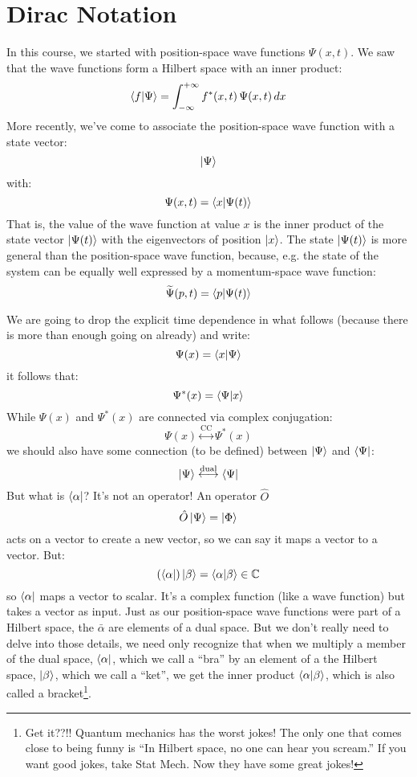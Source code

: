 \documentclass[12pt]{book}
\begin{document}
\section{Dirac Notation}

In this course, we started with position-space wave functions $\Psi(x,t)$.  We saw that the wave functions form a Hilbert space with an inner product:
$$\braket{f|\Psi} = \int_{-\infty}^{+\infty} f^*(x,t) \, \Psi(x,t) \, dx$$
More recently, we've come to associate the position-space wave function with a state vector:
$$\ket{\Psi}$$
with:
$$\Psi(x,t) = \braket{x|\Psi(t)}$$
That is, the value of the wave function at value $x$ is the inner product of the state vector 
$\ket{\Psi(t)}$ with the eigenvectors of position $\ket{x}$.  The state $\ket{\Psi(t)}$ is more general than the position-space wave function, because, e.g. the state of the system can be equally well expressed by a momentum-space wave function:
$$\widetilde{\Psi}(p,t) = \braket{p|\Psi(t)}$$

We are going to drop the explicit time dependence in what follows (because there is more than enough going on already) and write:
$$\Psi(x) = \braket{x|\Psi}$$
it follows that:
$$\Psi^*(x) = \braket{\Psi|x}$$
While $\Psi(x)$ and $\Psi^*(x)$ are connected via complex conjugation:
$$\Psi(x) \overset{\text{CC}}{\longleftrightarrow} \Psi^*(x)$$
we should also have some connection (to be defined) between $\ket{\Psi}$ and $\bra{\Psi}$:
$$\ket{\Psi} \overset{\text{dual}}{\longleftrightarrow} \bra{\Psi}$$
But what is $\bra{\alpha}$?  It's not an operator!  An operator $\hat{O}$
$$\hat{O} \ket{\Psi} = \ket{\Phi}$$
acts on a vector to create a new vector, so we can say it maps a vector to a vector.  But:
$$(\bra{\alpha}) \ket{\beta} = \braket{\alpha|\beta} \in \mathbb{C}$$
so $\bra{\alpha}$ maps a vector to scalar.  It's a complex function (like a wave function) but takes a vector as input.  Just as our position-space wave functions were part of a Hilbert space, the $\bar{\alpha}$ are elements of a dual space.  But we don't really need to delve into those details, we need only recognize that when we multiply a member of the dual space, $\bra{\alpha}$, which we call a ``bra''
by an element of a the Hilbert space, $\ket{\beta}$, which we call a ``ket'', we get the inner product
$\braket{\alpha|\beta}$, which is also called a bracket\footnote{Get it??!!  Quantum mechanics has the worst jokes!  The only one that comes close to being funny is ``In Hilbert space, no one can hear you scream.'' If you want good jokes, take Stat Mech.  Now they have some great jokes!}.
\end{document}
